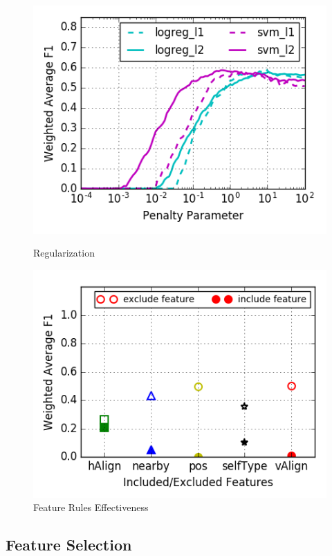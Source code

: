 \begin{figure}
\centering
\begin{minipage}{.5\linewidth}
  \centering
  \includegraphics[width=1\linewidth]{reg_K-FOLD}
  \caption{Regularization}
  \label{fig:reg}
\end{minipage}%
\begin{minipage}{.5\linewidth}
  \centering 
  \includegraphics[width=1\linewidth]{incfeatures_K-FOLD_svm_python}
  \caption{Feature Rules Effectiveness}
  \label{fig:fetrule}
\end{minipage}
\end{figure}

\subsection{Feature Selection}

